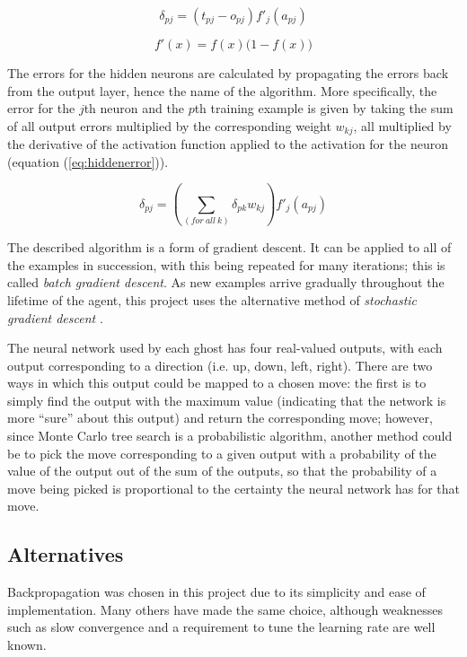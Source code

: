 \begin{equation}
\delta_{pj} = (t_{pj} - o_{pj})f'_j(a_{pj})
\label{eq:outputerror}
\end{equation}

\begin{equation}
f'(x) = f(x)\big(1 - f(x)\big)
\label{eq:sigd}
\end{equation}

The errors for the hidden neurons are calculated by propagating the errors back from the output layer, hence the name of the algorithm.  More specifically, the error for the $j$th neuron and the $p$th training example is given by taking the sum of all output errors multiplied by the corresponding weight $w_{kj}$, all multiplied by the derivative of the activation function applied to the activation for the neuron (equation (\ref{eq:hiddenerror})).

\begin{equation}
\delta_{pj} = \left(\sum_{(for~all~k)}\delta_{pk}w_{kj}\right)f'_{j}(a_{pj})
\label{eq:hiddenerror}
\end{equation}

The described algorithm is a form of gradient descent.  It can be applied to all of the examples in succession, with this being repeated for many iterations; this is called \emph{batch gradient descent}.  As new examples arrive gradually throughout the lifetime of the agent, this project uses the alternative method of \emph{stochastic gradient descent} \citep[p. 720]{RussellNorvig}.

The neural network used by each ghost has four real-valued outputs, with each output corresponding to a direction (i.e. up, down, left, right).  There are two ways in which this output could be mapped to a chosen move: the first is to simply find the output with the maximum value (indicating that the network is more ``sure'' about this output) and return the corresponding move; however, since Monte Carlo tree search is a probabilistic algorithm, another method could be to pick the move corresponding to a given output with a probability of the value of the output out of the sum of the outputs, so that the probability of a move being picked is proportional to the certainty the neural network has for that move.

\subsection{Alternatives}

Backpropagation was chosen in this project due to its simplicity and ease of implementation.  Many others have made the same choice, although weaknesses such as slow convergence and a requirement to tune the learning rate are well known.

